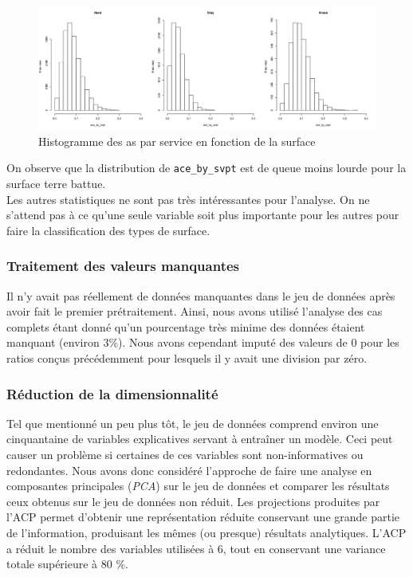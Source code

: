 \begin{figure}[H]
	\caption{Histogramme des as par service en fonction de la surface}
	\label{fig:acebyshist}
	\includegraphics[width=\textwidth]{acebysurfacehist}
\end{figure}

On observe que la distribution de \texttt{ace\_by\_svpt} est de queue moins lourde pour la surface terre battue.\\

Les autres statistiques ne sont pas très intéressantes pour l'analyse. On ne s'attend pas à ce qu'une seule variable soit plus importante pour les autres pour faire la classification des types de surface.

\subsubsection{Traitement des valeurs manquantes}
Il n'y avait pas réellement de données manquantes dans le jeu de données après avoir fait le premier prétraitement. Ainsi, nous avons utilisé l'analyse des cas complets étant donné qu'un pourcentage très minime des données étaient manquant (environ 3\%). Nous avons cependant imputé des valeurs de 0 pour les ratios conçus précédemment pour lesquels il y avait une division par zéro.

\subsubsection{Réduction de la dimensionnalité}
Tel que mentionné un peu plus tôt, le jeu de données comprend environ une cinquantaine de variables explicatives servant à entraîner un modèle. Ceci peut causer un problème si certaines de ces variables sont non-informatives ou redondantes. Nous avons donc considéré l'approche de faire une analyse en composantes principales (\textit{PCA}) sur le jeu de données et comparer les résultats ceux obtenus sur le jeu de données non réduit. Les projections produites par l'ACP permet d'obtenir une représentation réduite conservant une grande partie de l'information, produisant les mêmes (ou presque) résultats analytiques. L'ACP a réduit le nombre des variables utilisées à 6, tout en conservant une variance totale supérieure à 80 \%.


